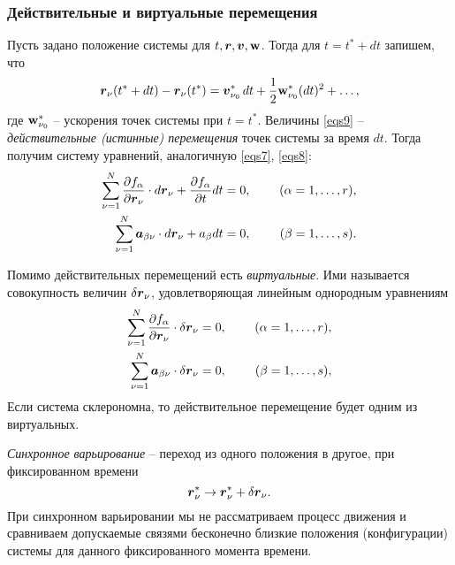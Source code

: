 \subsubsection*{Действительные и виртуальные перемещения}
Пусть задано положение системы для $t, \mbox{\boldmath $r$}, \mbox{\boldmath $v$}, \mbox{\boldmath $\mathrm{w}$}$. Тогда для $t = t^* + dt$ запишем, что
\begin{equation}
\label{eqs9}
    \mbox{\boldmath $r$}_\nu (t^* + dt) - \mbox{\boldmath $r$}_\nu (t^*) = \mbox{\boldmath $v$}_{\nu_0}^* \, d t + \frac{1}{2} \mbox{\boldmath $\mathrm{w}$}^*_{\nu_0} (dt)^2 + \ldots,
\end{equation}
где $\mbox{\boldmath $\mathrm{w}$}_{\nu_0}^*$ -- ускорения точек системы при $t = t^*$. Величины \eqref{eqs9} -- \textit{действительные (истинные) перемещения} точек системы за время $dt$. Тогда получим систему уравнений, аналогичную \eqref{eqs7}, \eqref{eqs8}:
\begin{align}
\label{eqs10}
    \sum_{\nu=1}^N \frac{\partial f_\alpha}{\partial \mbox{\boldmath $r$}_\nu} \cdot d \mbox{\boldmath $r$}_\nu + \frac{\partial f_\alpha}{\partial t} d t &= 0,
    \hspace{0.5cm} &(\alpha = 1, \ldots, r), \\
\label{eqs11}
    \sum_{\nu=1}^N \mbox{\boldmath $a$}_{\beta\nu} \cdot d \mbox{\boldmath $r$}_\nu + a_\beta d t &= 0,
    \hspace{0.5cm} &(\beta = 1, \ldots, s).
\end{align}


Помимо действительных перемещений есть \textit{виртуальные}. Ими называется совокупность величин $\delta \mbox{\boldmath $r$}_\nu$, удовлетворяющая линейным однородным уравнениям
\begin{align}
\label{eqs12}
    \sum_{\nu=1}^N \frac{\partial f_\alpha}{\partial \mbox{\boldmath $r$}_\nu} \cdot \delta \mbox{\boldmath $r$}_\nu  &= 0,
    \hspace{0.5cm} &(\alpha = 1, \ldots, r), \\
\label{eqs13}
    \sum_{\nu=1}^N \mbox{\boldmath $a$}_{\beta\nu} \cdot \delta \mbox{\boldmath $r$}_\nu  &= 0,
    \hspace{0.5cm} &(\beta = 1, \ldots, s),
\end{align}
Если система склерономна, то действительное перемещение будет одним из виртуальных.

\begin{to_def} 
    \textit{Синхронное варьирование} -- переход из одного положения в другое, при фиксированном времени
    $$
        \mbox{\boldmath $r$}_\nu^* \to \mbox{\boldmath $r$}_\nu^* + \delta \mbox{\boldmath $r$}_\nu.
    $$
    При синхронном варьировании мы не рассматриваем процесс движения и сравниваем допускаемые связями
    бесконечно близкие положения (конфигурации) системы для данного фиксированного момента времени.
\end{to_def}

